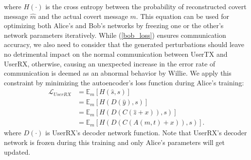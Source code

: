 where \(H(\cdot)\) is the cross entropy between the probability of reconstructed covert message \(\hat{m}\) and the actual covert message \(m\). This equation can be used for optimizing both Alice's and Bob's networks by freezing one or the other's network parameters iteratively. While (\ref{bob_loss}) ensures communication accuracy, we also need to consider that the generated perturbations should leave no detrimental impact on the normal communication between UserTX and UserRX, otherwise, causing an unexpected increase in the error rate of communication is deemed as an abnormal behavior by Willie. We apply this constraint by minimizing the autoencoder's loss function during Alice's training:
\begin{equation}
	\begin{aligned} \label{alice_user_loss}
	\mathcal{L}_{UserRX} & = \mathbb{E}_{m}[H(\hat{s}, s)] \\
	& = \mathbb{E}_{m}[H(D(\hat{y}), s)] \\
	& = \mathbb{E}_{m}[H(D(C(\hat{z} + x)), s)] \\
	& = \mathbb{E}_{m}[H(D(C(A(m, t) + x)), s)].
	\end{aligned}
\end{equation}
where \(D(\cdot)\) is UserRX's decoder network function. Note that UserRX's decoder network is frozen during this training and only Alice's parameters will get updated.


